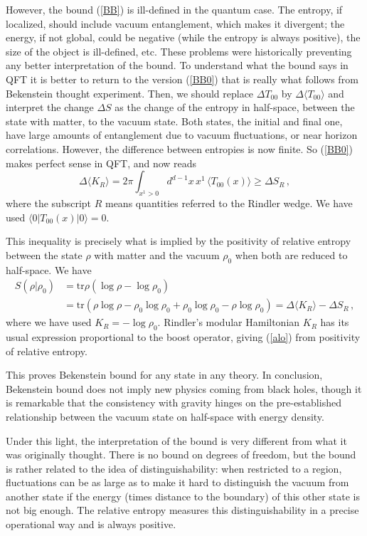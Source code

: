 \documentclass[11pt]{article}
\numberwithin{equation}{section}
\newcommand{\be}{\begin{equation}}
\newcommand{\ee}{\end{equation}}
\begin{document}
However, the bound (\ref{BB}) is ill-defined in the quantum case. The entropy, if localized, should include vacuum entanglement, which makes it divergent; the energy, if not global, could be negative (while the entropy is always positive), the size of the object is ill-defined, etc. These problems were historically preventing any better interpretation of the bound. To understand what the bound says in QFT it is better to return to the version (\ref{BB0}) that is really what follows from Bekenstein thought experiment. Then, we should replace $\Delta T_{00}$ by $\Delta \langle T_{00}\rangle $ and interpret the change $\Delta S$ as the change of the entropy in half-space, between the state with matter, to the vacuum state. Both states, the initial and final one, have large amounts of entanglement due to vacuum fluctuations, or near horizon correlations. However, the difference between entropies is now finite. So (\ref{BB0}) makes perfect sense in QFT, and now reads
\be
\Delta \langle K_R \rangle= 2\pi \int_{x^1> 0}d^{d-1}x\,  x^1\,  \langle T_{00}(x)\rangle \ge \Delta S_R\,,           \label{alo}
\ee
where the subscript $R$ means quantities referred to the Rindler wedge. We have used $\langle 0|T_{00}(x)|0\rangle=0$. 

This inequality is precisely what is implied by the positivity of relative entropy between the state $\rho$ with matter and the vacuum $\rho_0$ when both are reduced to half-space. We have
\begin{align}
S(\rho|\rho_0) &=\textrm{tr} \rho (\log \rho -\log \rho_0) \nonumber\\
&= \textrm{tr} \left(\rho \log \rho -\rho_0\log \rho_0 + \rho_0\log \rho_0-\rho \log \rho_0\right)=\Delta \langle K_R \rangle - \Delta S_R\,,
\end{align}
where we have used $K_R=-\log \rho_0$. Rindler's modular Hamiltonian $K_R$ has its usual expression proportional to the boost operator, giving (\ref{alo}) from positivity of relative entropy.

This proves Bekenstein bound for any state in any theory. In conclusion, Bekenstein bound does not imply new physics coming from black holes, though it is remarkable that the consistency with gravity hinges on the pre-established relationship between the vacuum state on half-space with energy density.      

Under this light, the interpretation of the bound is very different from what it was originally thought. There is no bound on degrees of freedom, but the bound is rather related to the idea of distinguishability: when restricted to a region, fluctuations can be as large as to make it hard to distinguish the vacuum from another state if the energy (times distance to the boundary) of this other state is not big enough. The relative entropy measures this distinguishability in a precise operational way and is always positive.     
\end{document}
